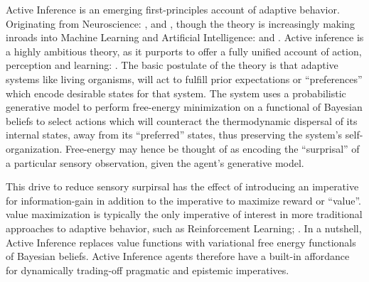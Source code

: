 \documentclass[onecolumn]{IEEEtran}
\begin{document}
Active Inference is an emerging first-principles account of adaptive behavior. Originating from Neuroscience: \textcite{A_FEP_For_The_Brain}, \textcite{The-Bayesian-Brain} and \textcite{Action-Behaviour-FE}, though the theory is increasingly making inroads into Machine Learning and Artificial Intelligence: \textcite{RL-or-AIF} and \textcite{Applications-of-FEP-Machine-Learning-Neuroscience}. Active inference is a highly ambitious theory, as it purports to offer a fully unified account of action, perception and learning: \textcite{FEP-Unified-Brain-Theory}. The basic postulate of the theory is that adaptive systems like living organisms, will act to fulfill prior expectations or ``preferences'' which encode desirable states for that system. The system uses a probabilistic generative model to perform free-energy minimization on a functional of Bayesian beliefs to select actions which will counteract the thermodynamic dispersal of its internal states, away from its ``preferred'' states, thus preserving the system's self-organization. Free-energy may hence be thought of as encoding the ``surprisal'' of a particular sensory observation, given the agent's generative model.

This drive to reduce sensory surpirsal has the effect of introducing an imperative for information-gain in addition to the imperative to maximize reward or ``value''. value maximization is typically the only imperative of interest in more traditional approaches to adaptive behavior, such as Reinforcement Learning; \textcite{Reinforcement-Learning-An-Introduction}. In a nutshell, Active Inference replaces value functions with variational free energy functionals of Bayesian beliefs. Active Inference agents therefore have a built-in affordance for dynamically trading-off pragmatic and epistemic imperatives. 
\end{document}

